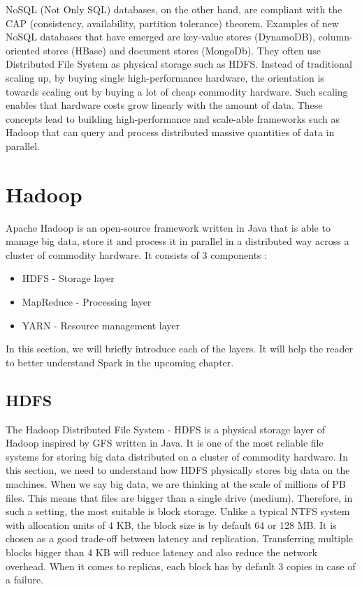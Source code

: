 NoSQL (Not Only SQL) databases, on the other hand, are compliant with the CAP (consistency, availability, partition tolerance) theorem.  Examples of new NoSQL databases that have emerged are key-value stores (DynamoDB), column-oriented stores (HBase) and document stores (MongoDb). They often use Distributed File System as physical storage such as HDFS. Instead of traditional scaling up, by buying single high-performance hardware, the orientation is towards scaling out by buying a lot of cheap commodity hardware. Such scaling enables that hardware costs grow linearly with the amount of data.  These concepts lead to building high-performance and scale-able frameworks such as Hadoop that can query and process distributed massive quantities of data in parallel. \cite{BigDataCourse} %

\section{Hadoop}
Apache Hadoop \cite{Hadoop} is an open-source framework written in Java that is able to manage big data, store it and process it in parallel in a distributed way across a cluster of commodity hardware. It consists of 3 components \cite{BigDataCourse}: %
\begin{itemize}
	\item HDFS - Storage layer
	\item MapReduce - Processing layer
	\item YARN - Resource management layer
\end{itemize}

In this section, we will briefly introduce each of the layers. It will help the reader to better understand Spark in the upcoming chapter.

\subsection{HDFS}
The Hadoop Distributed File System - HDFS \cite{HDFS} is a physical storage layer of Hadoop inspired by GFS \cite{GFS} written in Java. It is one of the most reliable file systems for storing big data distributed on a cluster of commodity hardware. In this section, we need to understand how HDFS physically stores big data on the machines. When we say big data, we are thinking at the scale of millions of PB files. This means that files are bigger than a single drive (medium). Therefore, in such a setting, the most suitable is block storage. Unlike a typical NTFS system with allocation units of 4 KB, the block size is by default 64 or 128 MB. It is chosen as a good trade-off between latency and replication. Transferring multiple blocks bigger than 4 KB will reduce latency and also reduce the network overhead. When it comes to replicas, each block has by default 3 copies in case of a failure.  

